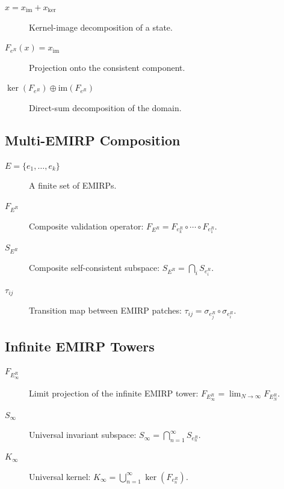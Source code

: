 \documentclass[11pt]{article}
\theoremstyle{definition}
\theoremstyle{plain}
\theoremstyle{remark}
\begin{document}
\begin{description}

\item[$x = x_{\mathrm{im}} + x_{\ker}$] Kernel-image decomposition of a
state.

\item[$F_{e^R}(x) = x_{\mathrm{im}}$] Projection onto the consistent
component.

\item[$\ker(F_{e^R}) \oplus \mathrm{im}(F_{e^R})$] Direct-sum
decomposition of the domain.

\end{description}

\subsection*{Multi-EMIRP Composition}

\begin{description}

\item[$E = \{e_1,\dots,e_k\}$] A finite set of EMIRPs.

\item[$F_{E^R}$] Composite validation operator:
$F_{E^R} = F_{e_k^R} \circ \cdots \circ F_{e_1^R}$.

\item[$S_{E^R}$] Composite self-consistent subspace:
$S_{E^R} = \bigcap_i S_{e_i^R}$.

\item[$\tau_{ij}$] Transition map between EMIRP patches:
$\tau_{ij} = \sigma_{e_j^R} \circ \sigma_{e_i^R}$.

\end{description}

\subsection*{Infinite EMIRP Towers}

\begin{description}

\item[$F_{E_\infty^R}$] Limit projection of the infinite EMIRP tower:
$F_{E_\infty^R} = \lim_{N\to\infty} F_{E_N^R}$.

\item[$S_\infty$] Universal invariant subspace:
$S_\infty = \bigcap_{n=1}^\infty S_{e_n^R}$.

\item[$K_\infty$] Universal kernel:
$K_\infty = \bigcup_{n=1}^\infty \ker(F_{e_n^R})$.

\end{description}
\end{document}
